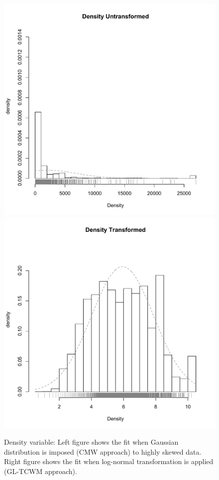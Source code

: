 \documentclass[11pt,letterpaper]{article}
\numberwithin{equation}{section}
\numberwithin{equation}{section}
\numberwithin{equation}{section}
\begin{document}
\begin{figure}[!htb]
\begin{center}
\caption{Density variable: Left figure shows the fit when Gaussian distribution is imposed (CMW approach) to highly skewed data. Right figure shows the fit when log-normal transformation is applied (GL-TCWM approach).}
\includegraphics[scale=0.40]{Density.pdf}
\includegraphics[scale=0.40]{logDensity.pdf}
\end{center}

\label{fig:vet1}
\end{figure}
\end{document}
